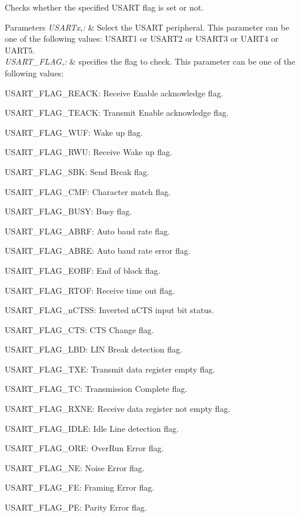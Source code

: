 Checks whether the specified U\-S\-A\-R\-T flag is set or not. 


\begin{DoxyParams}{Parameters}
{\em U\-S\-A\-R\-Tx,\-:} & Select the U\-S\-A\-R\-T peripheral. This parameter can be one of the following values\-: U\-S\-A\-R\-T1 or U\-S\-A\-R\-T2 or U\-S\-A\-R\-T3 or U\-A\-R\-T4 or U\-A\-R\-T5. \\
\hline
{\em U\-S\-A\-R\-T\-\_\-\-F\-L\-A\-G,\-:} & specifies the flag to check. This parameter can be one of the following values\-: \begin{DoxyItemize}
\item U\-S\-A\-R\-T\-\_\-\-F\-L\-A\-G\-\_\-\-R\-E\-A\-C\-K\-: Receive Enable acknowledge flag. \item U\-S\-A\-R\-T\-\_\-\-F\-L\-A\-G\-\_\-\-T\-E\-A\-C\-K\-: Transmit Enable acknowledge flag. \item U\-S\-A\-R\-T\-\_\-\-F\-L\-A\-G\-\_\-\-W\-U\-F\-: Wake up flag. \item U\-S\-A\-R\-T\-\_\-\-F\-L\-A\-G\-\_\-\-R\-W\-U\-: Receive Wake up flag. \item U\-S\-A\-R\-T\-\_\-\-F\-L\-A\-G\-\_\-\-S\-B\-K\-: Send Break flag. \item U\-S\-A\-R\-T\-\_\-\-F\-L\-A\-G\-\_\-\-C\-M\-F\-: Character match flag. \item U\-S\-A\-R\-T\-\_\-\-F\-L\-A\-G\-\_\-\-B\-U\-S\-Y\-: Busy flag. \item U\-S\-A\-R\-T\-\_\-\-F\-L\-A\-G\-\_\-\-A\-B\-R\-F\-: Auto baud rate flag. \item U\-S\-A\-R\-T\-\_\-\-F\-L\-A\-G\-\_\-\-A\-B\-R\-E\-: Auto baud rate error flag. \item U\-S\-A\-R\-T\-\_\-\-F\-L\-A\-G\-\_\-\-E\-O\-B\-F\-: End of block flag. \item U\-S\-A\-R\-T\-\_\-\-F\-L\-A\-G\-\_\-\-R\-T\-O\-F\-: Receive time out flag. \item U\-S\-A\-R\-T\-\_\-\-F\-L\-A\-G\-\_\-n\-C\-T\-S\-S\-: Inverted n\-C\-T\-S input bit status. \item U\-S\-A\-R\-T\-\_\-\-F\-L\-A\-G\-\_\-\-C\-T\-S\-: C\-T\-S Change flag. \item U\-S\-A\-R\-T\-\_\-\-F\-L\-A\-G\-\_\-\-L\-B\-D\-: L\-I\-N Break detection flag. \item U\-S\-A\-R\-T\-\_\-\-F\-L\-A\-G\-\_\-\-T\-X\-E\-: Transmit data register empty flag. \item U\-S\-A\-R\-T\-\_\-\-F\-L\-A\-G\-\_\-\-T\-C\-: Transmission Complete flag. \item U\-S\-A\-R\-T\-\_\-\-F\-L\-A\-G\-\_\-\-R\-X\-N\-E\-: Receive data register not empty flag. \item U\-S\-A\-R\-T\-\_\-\-F\-L\-A\-G\-\_\-\-I\-D\-L\-E\-: Idle Line detection flag. \item U\-S\-A\-R\-T\-\_\-\-F\-L\-A\-G\-\_\-\-O\-R\-E\-: Over\-Run Error flag. \item U\-S\-A\-R\-T\-\_\-\-F\-L\-A\-G\-\_\-\-N\-E\-: Noise Error flag. \item U\-S\-A\-R\-T\-\_\-\-F\-L\-A\-G\-\_\-\-F\-E\-: Framing Error flag. \item U\-S\-A\-R\-T\-\_\-\-F\-L\-A\-G\-\_\-\-P\-E\-: Parity Error flag. \end{DoxyItemize}

\end{DoxyParams}
